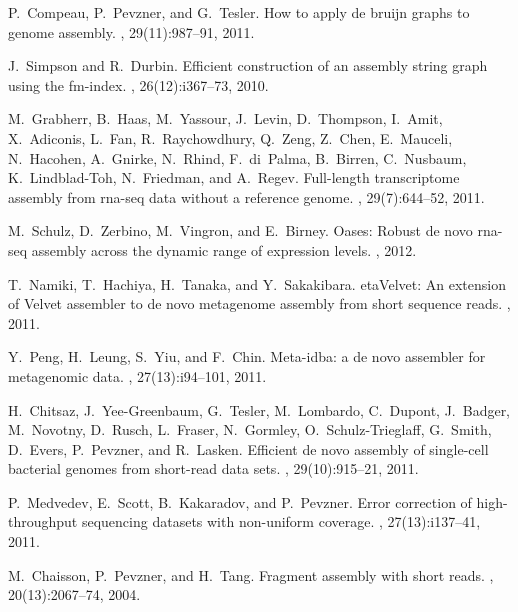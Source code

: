 \documentclass{pnastwo}
\begin{document}
\begin{article}
\begin{thebibliography}{10}
P.~Compeau, P.~Pevzner, and G.~Tesler.
\newblock How to apply de bruijn graphs to genome assembly.
, 29(11):987--91, 2011.

J.~Simpson and R.~Durbin.
\newblock Efficient construction of an assembly string graph using the
  fm-index.
, 26(12):i367--73, 2010.

M.~Grabherr, B.~Haas, M.~Yassour, J.~Levin, D.~Thompson, I.~Amit, X.~Adiconis,
  L.~Fan, R.~Raychowdhury, Q.~Zeng, Z.~Chen, E.~Mauceli, N.~Hacohen, A.~Gnirke,
  N.~Rhind, F.~di~Palma, B.~Birren, C.~Nusbaum, K.~Lindblad-Toh, N.~Friedman,
  and A.~Regev.
\newblock Full-length transcriptome assembly from rna-seq data without a
  reference genome.
, 29(7):644--52, 2011.

M.~Schulz, D.~Zerbino, M.~Vingron, and E.~Birney.
\newblock Oases: Robust de novo rna-seq assembly across the dynamic range of
  expression levels.
, 2012.

T.~Namiki, T.~Hachiya, H.~Tanaka, and Y.~Sakakibara.
eta{V}elvet: {A}n extension of {V}elvet assembler to de novo
  metagenome assembly from short sequence reads.
, 2011.

Y.~Peng, H.~Leung, S.~Yiu, and F.~Chin.
\newblock Meta-idba: a de novo assembler for metagenomic data.
, 27(13):i94--101, 2011.

H.~Chitsaz, J.~Yee-Greenbaum, G.~Tesler, M.~Lombardo, C.~Dupont, J.~Badger,
  M.~Novotny, D.~Rusch, L.~Fraser, N.~Gormley, O.~Schulz-Trieglaff, G.~Smith,
  D.~Evers, P.~Pevzner, and R.~Lasken.
\newblock Efficient de novo assembly of single-cell bacterial genomes from
  short-read data sets.
, 29(10):915--21, 2011.

P.~Medvedev, E.~Scott, B.~Kakaradov, and P.~Pevzner.
\newblock Error correction of high-throughput sequencing datasets with
  non-uniform coverage.
, 27(13):i137--41, 2011.

M.~Chaisson, P.~Pevzner, and H.~Tang.
\newblock Fragment assembly with short reads.
, 20(13):2067--74, 2004.


\end{thebibliography}
\end{article}
\end{document}
